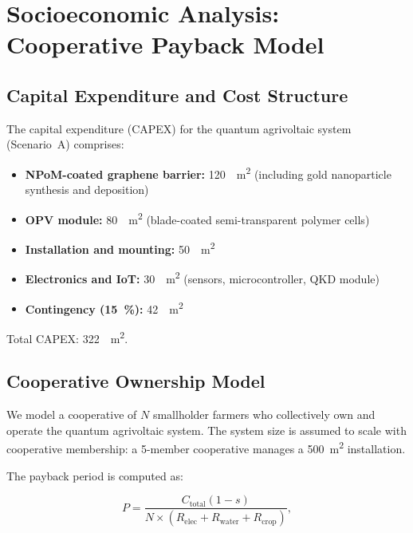 \documentclass[11pt,a4paper]{article}
\begin{document}

\section{Socioeconomic Analysis: Cooperative Payback Model}
\label{SI-sec:socioeconomic}

\subsection{Capital Expenditure and Cost Structure}

The capital expenditure (CAPEX) for the quantum agrivoltaic system (Scenario~A) comprises:
\begin{itemize}
\item \textbf{NPoM-coated graphene barrier:} \SI{120}{\per\m\squared} (including gold nanoparticle synthesis and deposition)
\item \textbf{OPV module:} \SI{80}{\per\m\squared} (blade-coated semi-transparent polymer cells)
\item \textbf{Installation and mounting:} \SI{50}{\per\m\squared}
\item \textbf{Electronics and IoT:} \SI{30}{\per\m\squared} (sensors, microcontroller, QKD module)
\item \textbf{Contingency (\SI{15}{\percent}):} \SI{42}{\per\m\squared}
\end{itemize}
Total CAPEX: \SI{322}{\per\m\squared}.

\subsection{Cooperative Ownership Model}

We model a cooperative of $N$ smallholder farmers who collectively own and operate the quantum agrivoltaic system.
The system size is assumed to scale with cooperative membership: a 5-member cooperative manages a \SI{500}{\m\squared} installation.

The payback period is computed as:

\begin{equation}
P = \frac{C_{\mathrm{total}} (1 - s)}{N \times (R_{\mathrm{elec}} + R_{\mathrm{water}} + R_{\mathrm{crop}})},
\label{eq:SI_payback}
\end{equation}
\end{document}
